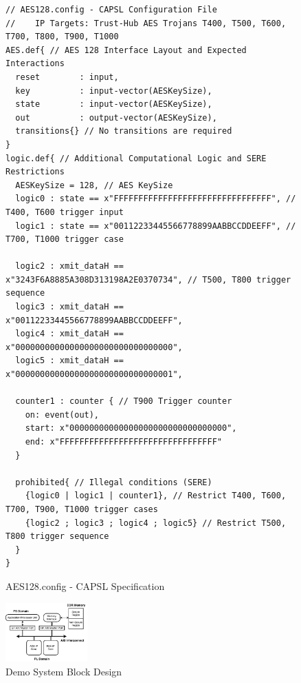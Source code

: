 \documentclass[sigconf]{acmart}
\theoremstyle{plain}
\theoremstyle{remark}
\begin{document}
\begin{figure} [t]
\begin{lstlisting}
// AES128.config - CAPSL Configuration File
//    IP Targets: Trust-Hub AES Trojans T400, T500, T600, T700, T800, T900, T1000
AES.def{ // AES 128 Interface Layout and Expected Interactions
  reset        : input,
  key          : input-vector(AESKeySize),
  state        : input-vector(AESKeySize),
  out          : output-vector(AESKeySize),
  transitions{} // No transitions are required
}
logic.def{ // Additional Computational Logic and SERE Restrictions
  AESKeySize = 128, // AES KeySize
  logic0 : state == x"FFFFFFFFFFFFFFFFFFFFFFFFFFFFFFFF", // T400, T600 trigger input
  logic1 : state == x"00112233445566778899AABBCCDDEEFF", // T700, T1000 trigger case

  logic2 : xmit_dataH == x"3243F6A8885A308D313198A2E0370734", // T500, T800 trigger sequence
  logic3 : xmit_dataH == x"00112233445566778899AABBCCDDEEFF",
  logic4 : xmit_dataH == x"00000000000000000000000000000000",
  logic5 : xmit_dataH == x"00000000000000000000000000000001",

  counter1 : counter { // T900 Trigger counter
    on: event(out),
    start: x"00000000000000000000000000000000",
    end: x"FFFFFFFFFFFFFFFFFFFFFFFFFFFFFFFF"
  }

  prohibited{ // Illegal conditions (SERE)
    {logic0 | logic1 | counter1}, // Restrict T400, T600, T700, T900, T1000 trigger cases
    {logic2 ; logic3 ; logic4 ; logic5} // Restrict T500, T800 trigger sequence
  }
}
\end{lstlisting}
\vspace*{-0.2cm}
\caption{AES128.config - CAPSL Specification}
\label{fig:AES128Spec}
\vspace*{-0.3cm}
\end{figure}

\begin{figure}
  \begin{center}
    \includegraphics[width=0.28\textwidth]{figures/BlockDesign.pdf}
  \end{center}
  \caption{Demo System Block Design} %
  \label{fig:BlockDesign}
\end{figure}
\end{document}
